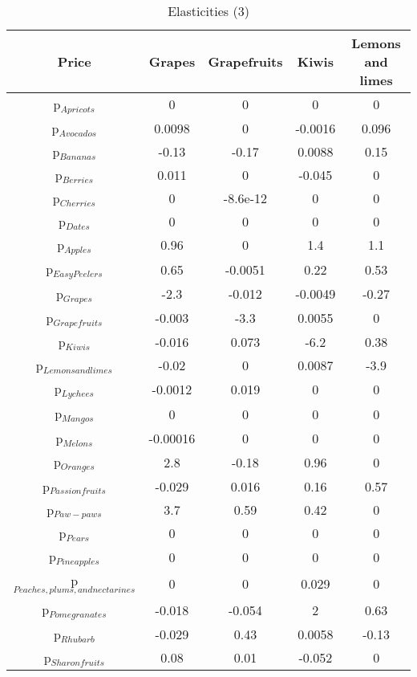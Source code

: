 \documentclass[11pt]{article}
\begin{document}
\begin{table}[h]
\caption{Elasticities (3)}
\label{Table: elasticities 3}
\begin{center}
\begin{tabular}{ccccc}
Price & Grapes & Grapefruits & Kiwis & Lemons and limes \\ \hline
p$_{Apricots}$ & 0 & 0 & 0 & 0 \\ 
p$_{Avocados}$ & 0.0098 & 0 & -0.0016 & 0.096 \\ 
p$_{Bananas}$ & -0.13 & -0.17 & 0.0088 & 0.15 \\ 
p$_{Berries}$ & 0.011 & 0 & -0.045 & 0 \\ 
p$_{Cherries}$ & 0 & -8.6e-12 & 0 & 0 \\ 
p$_{Dates}$ & 0 & 0 & 0 & 0 \\ 
p$_{Apples}$ & 0.96 & 0 & 1.4 & 1.1 \\ 
p$_{Easy Peelers}$ & 0.65 & -0.0051 & 0.22 & 0.53 \\ 
p$_{Grapes}$ & -2.3 & -0.012 & -0.0049 & -0.27 \\ 
p$_{Grapefruits}$ & -0.003 & -3.3 & 0.0055 & 0 \\ 
p$_{Kiwis}$ & -0.016 & 0.073 & -6.2 & 0.38 \\ 
p$_{Lemons and limes}$ & -0.02 & 0 & 0.0087 & -3.9 \\ 
p$_{Lychees}$ & -0.0012 & 0.019 & 0 & 0 \\ 
p$_{Mangos}$ & 0 & 0 & 0 & 0 \\ 
p$_{Melons}$ & -0.00016 & 0 & 0 & 0 \\ 
p$_{Oranges}$ & 2.8 & -0.18 & 0.96 & 0 \\ 
p$_{Passion fruits}$ & -0.029 & 0.016 & 0.16 & 0.57 \\ 
p$_{Paw-paws}$ & 3.7 & 0.59 & 0.42 & 0 \\ 
p$_{Pears}$ & 0 & 0 & 0 & 0 \\ 
p$_{Pineapples}$ & 0 & 0 & 0 & 0 \\ 
p$_{Peaches, plums, and nectarines}$ & 0 & 0 & 0.029 & 0 \\ 
p$_{Pomegranates}$ & -0.018 & -0.054 & 2 & 0.63 \\ 
p$_{Rhubarb}$ & -0.029 & 0.43 & 0.0058 & -0.13 \\ 
p$_{Sharon fruits}$ & 0.08 & 0.01 & -0.052 & 0 \\ 
\end{tabular}
\end{center}
\end{table}
\end{document}
